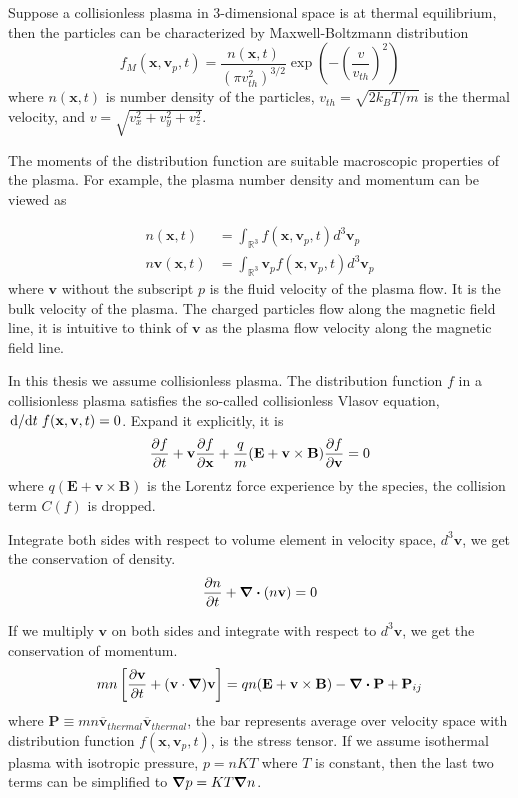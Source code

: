 Suppose a collisionless plasma in 3-dimensional space is at thermal equilibrium, then the particles can be characterized by Maxwell-Boltzmann distribution
\[ f_M(\mathbf{x}, \mathbf{v}_p, t) = \frac{n(\mathbf{x}, t)}{(\pi v_{th}^2)^{3/2}} \exp(-\left(\frac{v}{v_{th}}\right)^2) \]
where $n(\mathbf{x},t)$ is number density of the particles, $v_{th} = \sqrt{2k_BT/m}$ is the thermal velocity, and $v=\sqrt{v_x^2+v_y^2+v_z^2}$.

The moments of the distribution function are suitable macroscopic properties of the plasma. For example, the plasma number density and momentum can be viewed as

\begin{equation}
	\begin{aligned}
		n(\mathbf{x}, t)           & = \int_{\mathbb{R}^3} f(\mathbf{x}, \mathbf{v}_p, t) d^3\mathbf{v}_p              \\
		n\mathbf{v}(\mathbf{x}, t) & = \int_{\mathbb{R}^3} \mathbf{v}_p f(\mathbf{x}, \mathbf{v}_p, t) d^3\mathbf{v}_p
	\end{aligned}
\end{equation}
where $\mathbf{v}$ without the subscript $p$ is the fluid velocity of the plasma flow. It is the bulk velocity of the plasma. The charged particles flow along the magnetic field line, it is intuitive to think of $\mathbf{v}$ as the plasma flow velocity along the magnetic field line.

In this thesis we assume collisionless plasma. The distribution function $f$ in a collisionless plasma satisfies the so-called collisionless Vlasov equation, $\dv*{t} f(\mathbf{x}, \mathbf{v}, t) = 0$. Expand it explicitly, it is
\begin{equation} \label{eq:vlasov}
	\pdv{f}{t} + \mathbf{v}\pdv{f}{\mathbf{x}} + \frac{q}{m}(\mathbf{E} + \mathbf{v}\times\mathbf{B})\pdv{f}{\mathbf{v}} = 0
\end{equation}
where $q(\mathbf{E} + \mathbf{v}\times\mathbf{B})$ is the Lorentz force experience by the species, the collision term $C(f)$ is dropped.

Integrate both sides with respect to volume element in velocity space, $d^3\mathbf{v}$, we get the conservation of density.
\begin{equation}
	\pdv{n}{t} + \div(n\mathbf{v}) = 0
\end{equation}

If we multiply $\mathbf{v}$ on both sides and integrate with respect to $d^3\mathbf{v}$, we get the conservation of momentum.
\begin{equation}
	mn\left[\pdv{\mathbf{v}}{t} + (\mathbf{v}\cdot\grad){\mathbf{v}} \right] = qn(\mathbf{E+v\times B}) - \div\mathbf{P} + \mathbf{P}_{ij}
\end{equation}
where $\mathbf{P}\equiv mn\overline{\mathbf{v}}_{thermal}\overline{\mathbf{v}}_{thermal}$, the bar represents average over velocity space with distribution function $f(\mathbf{x}, \mathbf{v}_p, t)$, is the stress tensor. If we assume isothermal plasma with isotropic pressure, $p=nKT$ where $T$ is constant, then the last two terms can be simplified to $\grad p = KT\grad n$.

